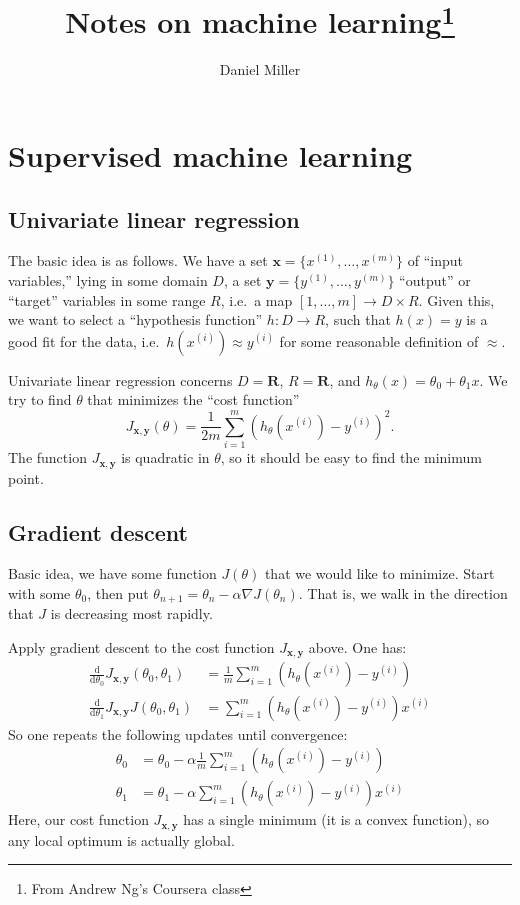 \documentclass{article}
\title{Notes on machine learning\thanks{From Andrew Ng's Coursera class}}
\author{Daniel Miller}
\newcommand{\bR}{\mathbf{R}}
\newcommand{\bx}{\mathbf{x}}
\newcommand{\by}{\mathbf{y}}
\newcommand{\dd}{\mathrm{d}}
\begin{document}
\maketitle





\section{Supervised machine learning}


\subsection{Univariate linear regression}

The basic idea is as follows. We have a set $\bx=\{x^{(1)},\dots,x^{(m)}\}$ of 
``input variables,'' lying in some domain $D$, a set 
$\by=\{y^{(1)},\dots,y^{(m)}\}$ ``output'' or ``target'' variables in some 
range $R$, i.e.~a map $[1,\dots,m]\to D\times R$. Given this, we want to select 
a ``hypothesis function'' $h\colon D\to R$, such that $h(x)=y$ is a good fit 
for the data, i.e.~$h(x^{(i)})\approx y^{(i)}$ for some reasonable definition 
of $\approx$. 

Univariate linear regression concerns $D=\bR$, $R=\bR$, and 
$h_\theta(x)=\theta_0+\theta_1 x$. We try to find $\theta$ that minimizes the 
``cost function'' 
\[
	J_{\bx,\by}(\theta) = \frac{1}{2m} \sum_{i=1}^m (h_\theta(x^{(i)}) - y^{(i)})^2 .
\]
The function $J_{\bx,\by}$ is quadratic in $\theta$, so it should be easy to 
find the minimum point.


\subsection{Gradient descent}

Basic idea, we have some function $J(\theta)$ that we would like to minimize. 
Start with some $\theta_0$, then put 
$\theta_{n+1} = \theta_n-\alpha \nabla J(\theta_n)$. That is, we walk in the 
direction that $J$ is decreasing most rapidly. 

Apply gradient descent to the cost function $J_{\bx,\by}$ above. One has:
\begin{align*}
	\frac{\dd}{\dd \theta_0} J_{\bx,\by}(\theta_0,\theta_1) &= \frac{1}{m} \sum_{i=1}^m (h_\theta(x^{(i)})-y^{(i)}) \\
	\frac{\dd}{\dd \theta_1} J_{\bx,\by} J(\theta_0,\theta_1) &= \sum_{i=1}^m (h_\theta(x^{(i)})-y^{(i)}) x^{(i)}
\end{align*}
So one repeats the following updates until convergence:
\begin{align*}
	\theta_0 &= \theta_0-\alpha\frac{1}{m} \sum_{i=1}^m (h_\theta(x^{(i)})-y^{(i)}) \\
	\theta_1 &= \theta_1-\alpha \sum_{i=1}^m (h_\theta(x^{(i)})-y^{(i)}) x^{(i)}
\end{align*}
Here, our cost function $J_{\bx,\by}$ has a single minimum (it is a convex 
function), so any local optimum is actually global. 
\end{document}
